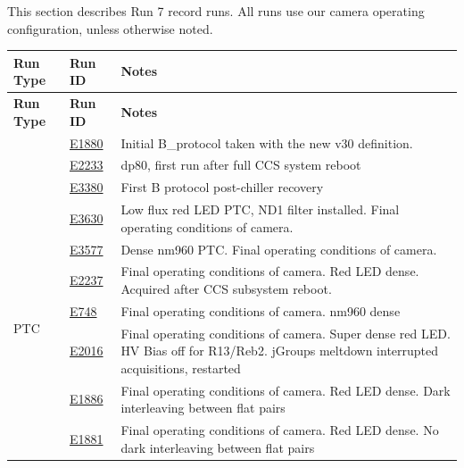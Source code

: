 This section describes Run 7 record runs. All runs use our camera operating configuration, unless otherwise noted.
\begin{longtable}{|p{5.0cm}|p{1.5cm}|p{8.5cm}|}
\hline
\textbf{Run Type} & \textbf{Run ID} & \textbf{Notes} \\ \hline
\endfirsthead
\hline
\textbf{Run Type} & \textbf{Run ID} & \textbf{Notes} \\ \hline
\endhead
\hline
\endfoot
\hline
\endlastfoot

\multirow{3}{*}{B-protocol} & \href{https://s3df.slac.stanford.edu/data/rubin/lsstcam/E1880/w_2024_35/}{E1880} & Initial B\_protocol taken with the new v30 definition. \\ \cline{2-3} 
                            & \href{https://s3df.slac.stanford.edu/data/rubin/lsstcam/E2233/w_2024_35/}{E2233} & dp80, first run after full CCS system reboot \\ \cline{2-3} 
                            & \href{https://s3df.slac.stanford.edu/data/rubin/lsstcam/E3380/w_2024_35/}{E3380} & First B protocol post-chiller recovery \\ \hline

\multirow{7}{*}{PTC}        & \href{https://s3df.slac.stanford.edu/data/rubin/lsstcam/E3630/w_2024_35/}{E3630} & Low flux red LED PTC, ND1 filter installed. Final operating conditions of camera. \\ \cline{2-3} 
                            & \href{https://s3df.slac.stanford.edu/data/rubin/lsstcam/E3577/w_2024_35/}{E3577} & Dense nm960 PTC. Final operating conditions of camera. \\ \cline{2-3} 
                            & \href{https://s3df.slac.stanford.edu/data/rubin/lsstcam/E2237/w_2024_35/}{E2237} & Final operating conditions of camera. Red LED dense. Acquired after CCS subsystem reboot. \\ \cline{2-3} 
                            & \href{https://s3df.slac.stanford.edu/data/rubin/lsstcam/E748/w_2024_35/}{E748} & Final operating conditions of camera. nm960 dense \\ \cline{2-3} 
                            & \href{https://s3df.slac.stanford.edu/data/rubin/lsstcam/E2016/w_2024_35/}{E2016} & Final operating conditions of camera. Super dense red LED. HV Bias off for R13/Reb2. jGroups meltdown interrupted acquisitions, restarted \\ \cline{2-3} 
                            & \href{https://s3df.slac.stanford.edu/data/rubin/lsstcam/E1886/w_2024_35/}{E1886} & Final operating conditions of camera. Red LED dense. Dark interleaving between flat pairs \\ \cline{2-3} 
                            & \href{https://s3df.slac.stanford.edu/data/rubin/lsstcam/E1881/w_2024_35/}{E1881} & Final operating conditions of camera. Red LED dense. No dark interleaving between flat pairs \\ \hline


\end{longtable}

